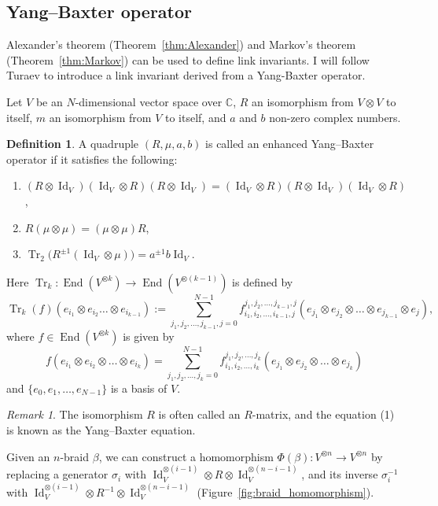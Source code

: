 \documentclass{amsart}
\newcommand{\C}{\mathbb{C}}
\newcommand{\Id}{\operatorname{Id}}
\newcommand{\End}{\operatorname{End}}
\newcommand{\Tr}{\operatorname{Tr}}
\theoremstyle{definition}
\newtheorem{definition}[theorem]{Definition}
\theoremstyle{remark}
\newtheorem{remark}[theorem]{Remark}
\numberwithin{equation}{section}
\begin{document}
\subsection{Yang--Baxter operator}
Alexander's theorem (Theorem~\ref{thm:Alexander}) and Markov's theorem (Theorem~\ref{thm:Markov}) can be used to define link invariants.
I will follow Turaev \cite{Turaev:INVEM88} to introduce a link invariant derived from a Yang-Baxter operator.
\par
Let $V$ be an $N$-dimensional vector space over $\C$, $R$ an isomorphism from $V\otimes V$ to itself, $m$ an isomorphism from $V$ to itself, and $a$ and $b$ non-zero complex numbers.
\begin{definition}\label{def:YB}
A quadruple $(R,\mu,a,b)$ is called an enhanced Yang--Baxter operator if it satisfies the following:
\begin{enumerate}
\item $(R\otimes\Id_V)(\Id_V\otimes R)(R\otimes\Id_V)
=(\Id_V\otimes R)(R\otimes\Id_V)(\Id_V\otimes R)$,
\item $R(\mu\otimes\mu)=(\mu\otimes\mu)R$,
\item $\Tr_2\bigl(R^{\pm1}(\Id_V\otimes\mu)\bigr)=a^{\pm1}b\Id_V$.
\end{enumerate}
Here $\Tr_k\colon\End(V^{\otimes k})\to\End(V^{\otimes(k-1)})$ is defined by
\begin{equation*}
  \Tr_k(f)(e_{i_1}\otimes e_{i_2}\dots\otimes e_{i_{k-1}})
  :=
  \sum_{j_1,j_2,\dots,j_{k-1},j=0}^{N-1}
  f_{i_1,i_2,\dots,i_{k-1},j}^{j_1,j_2,\dots,j_{k-1},j}
  (e_{j_1}\otimes e_{j_2}\otimes\dots\otimes e_{j_{k-1}}\otimes e_{j}),
\end{equation*}
where $f\in\End(V^{\otimes k})$ is given by
\begin{equation*}
  f(e_{i_1}\otimes e_{i_2}\otimes\dots\otimes e_{i_k})
  =
  \sum_{j_1,j_2,\dots,j_k=0}^{N-1}
  f_{i_1,i_2,\dots,i_k}^{j_1,j_2,\dots,j_k}
  (e_{j_1}\otimes e_{j_2}\otimes\dots\otimes e_{j_k})
\end{equation*}
and $\{e_0,e_1,\dots,e_{N-1}\}$ is a basis of $V$.
\end{definition}
\begin{remark}
The isomorphism $R$ is often called  an $R$-matrix, and the equation {\rm(1)} is known as the Yang--Baxter equation.
\end{remark}
\par
Given an $n$-braid $\beta$, we can construct a homomorphism $\Phi(\beta)\colon V^{\otimes n}\to V^{\otimes n}$ by replacing a generator $\sigma_i$ with $\Id_V^{\otimes(i-1)}\otimes R\otimes\Id_V^{\otimes(n-i-1)}$, and its inverse $\sigma_i^{-1}$ with $\Id_V^{\otimes(i-1)}\otimes R^{-1}\otimes\Id_V^{\otimes(n-i-1)}$ (Figure~\ref{fig:braid_homomorphism}).
\end{document}
